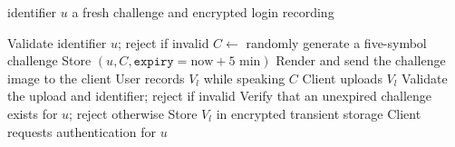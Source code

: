 \documentclass[runningheads]{llncs}
\begin{document}
{\color{black}
\begin{algorithm}[H]
\caption{\textcolor{black}{Login and Challenge Issuance}}\label{alg:challenge}
\begin{algorithmic}[1]
\small
\Require identifier $u$
\Ensure a fresh challenge and encrypted login recording

\State Validate identifier $u$; reject if invalid
\State $C \gets$ randomly generate a five-symbol challenge
\State Store $(u,C,\texttt{expiry}=\text{now}+5\text{ min})$
\State Render and send the challenge image to the client
\State User records $V_l$ while speaking $C$
\State Client uploads $V_l$
\State Validate the upload and identifier; reject if invalid
\State Verify that an unexpired challenge exists for $u$; reject otherwise
\State Store $V_l$ in encrypted transient storage
\State Client requests authentication for $u$
\end{algorithmic}
\end{algorithm}
}
\end{document}
